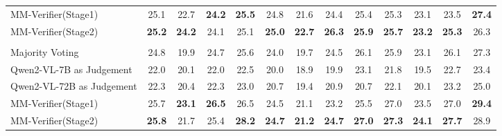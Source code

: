 \begin{table*}[htbp]
{\begin{tabular}{l|c|c|c|c|c|c|c|c|c|c|c|c}
    MM-Verifier(Stage1) & 25.1  & 22.7  & \textbf{24.2}  & \textbf{25.5}  & 24.8  & 21.6  & 24.4  & 25.4  & 25.3  & 23.1  & 23.5  & \textbf{27.4} \\
    MM-Verifier(Stage2) & \textbf{25.2}  & \textbf{24.2}  & 24.1  & 25.1  & \textbf{25.0}  & \textbf{22.7}  & \textbf{26.3}  & \textbf{25.9}  & \textbf{25.7}  & \textbf{23.2}  & \textbf{25.3}  & 26.3 \\
    \midrule
    \rowcolor[rgb]{ .851,  .882,  .949} \multicolumn{13}{c}{ \textit{Sample  12}} \\
    \midrule
    Majority Voting & 24.8  & 19.9  & 24.7  & 25.6  & 24.0  & 19.7  & 24.5  & 26.1  & 25.9  & 23.1  & 26.1  & 27.3 \\
    Qwen2-VL-7B as Judgement & 22.0  & 20.1  & 22.0  & 22.5  & 20.0  & 18.9  & 19.9  & 23.1  & 21.8  & 19.5  & 22.7  & 23.4 \\
    Qwen2-VL-72B as Judgement  & 22.3 & 20.4 & 22.3 & 23.0 & 20.7 & 19.4 & 20.9 & 20.7 & 22.1 & 20.1 & 23.2 & 25.0\\
    MM-Verifier(Stage1) & 25.7  & \textbf{23.1}  & \textbf{26.5}  & 26.5  & 24.5  & 21.1  & 23.2  & 25.5  & 27.0  & 23.5  & 27.0  & \textbf{29.4} \\
    MM-Verifier(Stage2) & \textbf{25.8}  & 21.7  & 25.4  & \textbf{28.2}  & \textbf{24.7}  & \textbf{21.2}  & \textbf{24.7}  & \textbf{27.0}  & \textbf{27.3}  & \textbf{24.1}  & \textbf{27.7}  & 28.9 \\
    \bottomrule
    \end{tabular}%
    }
  \label{tab:abla_mathverse}%
  \vspace{-4mm}
\end{table*}%
